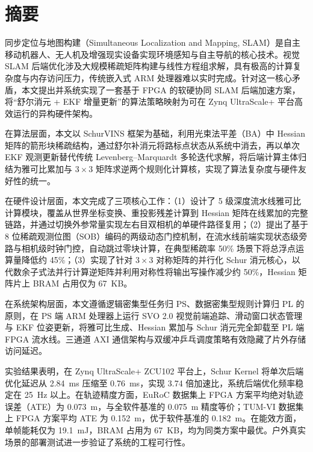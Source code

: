 
\maketitle%
\MAKETITLE%
\makedeclaration%
\intobmk\chapter*{摘\quad 要}%
\setcounter{page}{1}%

同步定位与地图构建（Simultaneous Localization and Mapping, SLAM）是自主移动机器人、无人机及增强现实设备实现环境感知与自主导航的核心技术。视觉 SLAM 后端优化涉及大规模稀疏矩阵构建与线性方程组求解，具有极高的计算复杂度与内存访问压力，传统嵌入式 ARM 处理器难以实时完成。针对这一核心矛盾，本文提出并系统实现了一套基于 FPGA 的软硬协同 SLAM 后端加速方案，将“舒尔消元 + EKF 增量更新”的算法策略映射为可在 Zynq UltraScale+ 平台高效运行的异构硬件架构。

在算法层面，本文以 SchurVINS 框架为基础，利用光束法平差（BA）中 Hessian 矩阵的箭形块稀疏结构，通过舒尔补消元将路标点状态从系统中消去，再以单次 EKF 观测更新替代传统 Levenberg--Marquardt 多轮迭代求解，将后端计算主体归结为雅可比累加与 $3 \times 3$ 矩阵求逆两个规则化计算核，实现了算法复杂度与硬件友好性的统一。

在硬件设计层面，本文完成了三项核心工作：（1）设计了 5 级深度流水线雅可比计算模块，覆盖从世界坐标变换、重投影残差计算到 Hessian 矩阵在线累加的完整链路，并通过切换外参常量实现左右目双相机的单硬件路径复用；（2）提出了基于 8 位稀疏观测位图（SOB）编码的两级动态门控机制，在流水线前端实现状态级旁路与相机级时钟门控，自动跳过零块计算，在典型稀疏率 50\% 场景下将总浮点运算量降低约 45\%；（3）实现了针对 $3 \times 3$ 对称矩阵的并行化 Schur 消元核心，以代数余子式法并行计算逆矩阵并利用对称性将输出写操作减少约 50\%，Hessian 矩阵片上 BRAM 占用仅为 67~KB。

在系统架构层面，本文遵循逻辑密集型任务归 PS、数据密集型规则计算归 PL 的原则，在 PS 端 ARM 处理器上运行 SVO 2.0 视觉前端追踪、滑动窗口状态管理与 EKF 位姿更新，将雅可比生成、Hessian 累加与 Schur 消元完全卸载至 PL 端 FPGA 流水线。三通道 AXI 通信架构与双缓冲乒乓调度策略有效隐藏了片外存储访问延迟。

实验结果表明，在 Zynq UltraScale+ ZCU102 平台上，Schur Kernel 将单次后端优化延迟从 2.84~ms 压缩至 0.76~ms，实现 3.74 倍加速比，系统后端优化频率稳定在 25~Hz 以上。在轨迹精度方面，EuRoC 数据集上 FPGA 方案平均绝对轨迹误差（ATE）为 0.073~m，与全软件基准的 0.075~m 精度等价；TUM-VI 数据集上 FPGA 方案平均 ATE 为 0.152~m，优于软件基准的 0.182~m。在能效方面，单帧能耗仅为 19.1~mJ，BRAM 占用为 67~KB，均为同类方案中最优。户外真实场景的部署测试进一步验证了系统的工程可行性。

